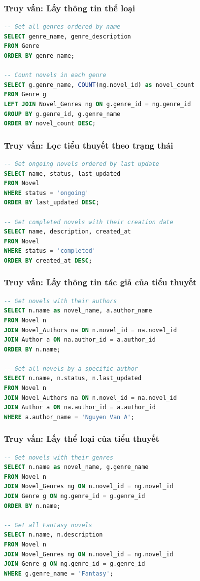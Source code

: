 \documentclass[12pt,aspectratio=169,handout]{beamer}
\begin{document}
\begin{frame}[fragile]
\frametitle{Truy vấn: Lấy thông tin thể loại}
\begin{lstlisting}[language=SQL, basicstyle=\small\ttfamily]
-- Get all genres ordered by name
SELECT genre_name, genre_description 
FROM Genre 
ORDER BY genre_name;

-- Count novels in each genre
SELECT g.genre_name, COUNT(ng.novel_id) as novel_count
FROM Genre g
LEFT JOIN Novel_Genres ng ON g.genre_id = ng.genre_id
GROUP BY g.genre_id, g.genre_name
ORDER BY novel_count DESC;
\end{lstlisting}
\end{frame}

\begin{frame}[fragile]
\frametitle{Truy vấn: Lọc tiểu thuyết theo trạng thái}
\begin{lstlisting}[language=SQL, basicstyle=\small\ttfamily]
-- Get ongoing novels ordered by last update
SELECT name, status, last_updated 
FROM Novel 
WHERE status = 'ongoing' 
ORDER BY last_updated DESC;

-- Get completed novels with their creation date
SELECT name, description, created_at
FROM Novel 
WHERE status = 'completed'
ORDER BY created_at DESC;
\end{lstlisting}
\end{frame}

\begin{frame}[fragile]
\frametitle{Truy vấn: Lấy thông tin tác giả của tiểu thuyết}
\begin{lstlisting}[language=SQL, basicstyle=\small\ttfamily]
-- Get novels with their authors
SELECT n.name as novel_name, a.author_name 
FROM Novel n
JOIN Novel_Authors na ON n.novel_id = na.novel_id
JOIN Author a ON na.author_id = a.author_id
ORDER BY n.name;

-- Get all novels by a specific author
SELECT n.name, n.status, n.last_updated
FROM Novel n
JOIN Novel_Authors na ON n.novel_id = na.novel_id
JOIN Author a ON na.author_id = a.author_id
WHERE a.author_name = 'Nguyen Van A';
\end{lstlisting}
\end{frame}

\begin{frame}[fragile]
\frametitle{Truy vấn: Lấy thể loại của tiểu thuyết}
\begin{lstlisting}[language=SQL, basicstyle=\small\ttfamily]
-- Get novels with their genres
SELECT n.name as novel_name, g.genre_name 
FROM Novel n
JOIN Novel_Genres ng ON n.novel_id = ng.novel_id
JOIN Genre g ON ng.genre_id = g.genre_id
ORDER BY n.name;

-- Get all Fantasy novels
SELECT n.name, n.description
FROM Novel n
JOIN Novel_Genres ng ON n.novel_id = ng.novel_id
JOIN Genre g ON ng.genre_id = g.genre_id
WHERE g.genre_name = 'Fantasy';
\end{lstlisting}
\end{frame}
\end{document}
